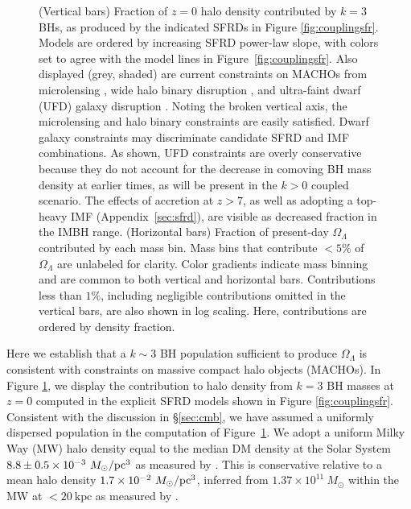 \documentclass[twocolumn,twocolappendix]{aastex631}
\begin{document}
\begin{appendix}
\begin{figure}
\caption{\label{fig:couplingmacho}
  (Vertical bars) Fraction of $z=0$ halo density contributed by $k=3$ BHs, as produced by the indicated SFRDs in Figure \ref{fig:couplingsfr}.
    Models are ordered by increasing SFRD power-law slope, with colors set to agree with the model lines in Figure~\ref{fig:couplingsfr}.
    Also displayed (grey, shaded) are current constraints on MACHOs from microlensing \citep{blaineau2022mulensing}, wide halo binary disruption \citep{tylerwidebinary2022, monroyallen2014widehalo}, and ultra-faint dwarf (UFD) galaxy disruption \citep{brandt16}.
    Noting the broken vertical axis, the microlensing and halo binary constraints are easily satisfied.
    Dwarf galaxy constraints may discriminate candidate SFRD and IMF combinations.
    As shown, UFD constraints are overly conservative because they do not account for the decrease in comoving BH mass density at earlier times, as will be present in the $k>0$ coupled scenario.
    The effects of accretion at $z > 7$, as well as adopting a top-heavy IMF (Appendix~\ref{sec:sfrd}), are visible as decreased fraction in the IMBH range.
    (Horizontal bars) Fraction of present-day $\Omega_\Lambda$ contributed by each mass bin.
    Mass bins that contribute $< 5\%$ of $\Omega_\Lambda$ are unlabeled for clarity.
    Color gradients indicate mass binning and are common to both vertical and horizontal bars.
    Contributions less than $1\%$, including negligible contributions omitted in the vertical bars, are also shown in log scaling.
    Here, contributions are ordered by density fraction.}
\end{figure}

Here we establish that a $k \sim 3$ BH population sufficient to produce $\Omega_\Lambda$ is consistent with constraints on massive compact halo objects (MACHOs).
In Figure \ref{fig:couplingmacho}, we display the contribution to halo density from $k=3$ BH masses at $z=0$ computed in the explicit SFRD models shown in Figure \ref{fig:couplingsfr}.
Consistent with the discussion in \S\ref{sec:cmb}, we have assumed a uniformly dispersed population in the computation of Figure~\ref{fig:couplingmacho}.
We adopt a uniform Milky Way (MW) halo density equal to the median DM density at the Solar System $8.8\pm0.5\times10^{-3}~M_\odot/\rm{pc}^3$ as measured by \citet{cautun2020milky}.
This is conservative relative to a mean halo density $1.7\times10^{-2}~M_\odot/\rm{pc}^3$, inferred from $1.37\times 10^{11}~M_\odot$ within the MW at $<20~\mathrm{kpc}$ as measured by \citet{posti2019mass}.


\end{appendix}
\end{document}
